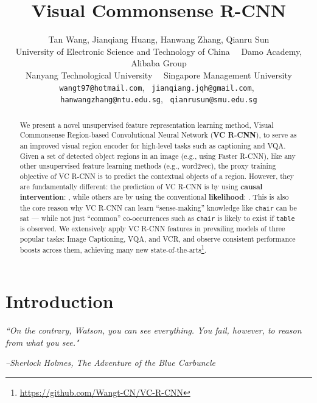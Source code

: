 \documentclass[10pt,twocolumn,letterpaper]{article}
\begin{document}
\title{Visual Commonsense R-CNN}
\author{Tan Wang, 
\quad Jianqiang Huang, 
\quad Hanwang Zhang, 
\quad Qianru Sun\\
\small University of Electronic Science and Technology of China~~
\small Damo Academy, Alibaba Group\\
\small Nanyang Technological University~~
\small Singapore Management University\\
\small {\texttt{wangt97@hotmail.com}},~
\small {\texttt{jianqiang.jqh@gmail.com}},~
\small {\texttt{hanwangzhang@ntu.edu.sg}},~
\small {\texttt{qianrusun@smu.edu.sg}}
\\
}

\maketitle


\begin{abstract}
We present a novel unsupervised feature representation learning method, Visual Commonsense Region-based Convolutional Neural Network (\textbf{VC R-CNN}), to serve as an improved visual region encoder for high-level tasks such as captioning and VQA. Given a set of detected object regions in an image (e.g., using Faster R-CNN), like any other unsupervised feature learning methods (e.g., word2vec), the proxy training objective of VC R-CNN is to predict the contextual objects of a region. However, they are fundamentally different: the prediction of VC R-CNN is by using \textbf{causal intervention}: , while others are by using the conventional \textbf{likelihood}: . This is also the core reason why VC R-CNN can learn ``sense-making'' knowledge 
like \texttt{chair} can be sat --- while not just ``common'' co-occurrences such as \texttt{chair} is likely to exist if \texttt{table} is observed. We extensively apply VC R-CNN features in prevailing models of three popular tasks: Image Captioning, VQA, and VCR, and observe consistent performance boosts across them, achieving many new state-of-the-arts\footnote{\url{https://github.com/Wangt-CN/VC-R-CNN}}.
\end{abstract}




\vspace{-0.1cm}
\section{Introduction}

\setlength{\epigraphwidth}{.9\columnwidth}
\renewcommand{\epigraphflush}{center}
\renewcommand{\textflush}{flushepinormal}
\epigraph{\textit{``On the contrary, Watson, you can see everything. You fail, however, to reason from what you see."} }
{{\footnotesize{\textit{--Sherlock Holmes, The Adventure of the Blue Carbuncle}}}}
\end{document}
